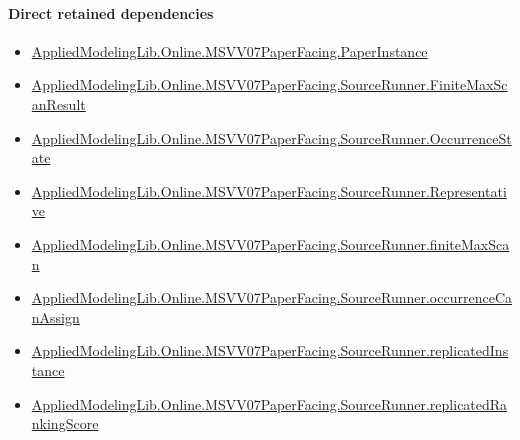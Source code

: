 \documentclass[10pt]{article}
\begin{document}
\paragraph{Direct retained dependencies}
\begin{itemize}\raggedright
\item \hyperlink{governing-declaration-11907576ec71eeb5}{Applied\allowbreak{}Modeling\allowbreak{}Lib.\allowbreak{}Online.\allowbreak{}MSVV07\allowbreak{}Paper\allowbreak{}Facing.\allowbreak{}Paper\allowbreak{}Instance}
\item \hyperlink{governing-declaration-ebb7db2383e5a26e}{Applied\allowbreak{}Modeling\allowbreak{}Lib.\allowbreak{}Online.\allowbreak{}MSVV07\allowbreak{}Paper\allowbreak{}Facing.\allowbreak{}Source\allowbreak{}Runner.\allowbreak{}Finite\allowbreak{}Max\allowbreak{}Scan\allowbreak{}Result}
\item \hyperlink{governing-declaration-2eff7815f49c1d41}{Applied\allowbreak{}Modeling\allowbreak{}Lib.\allowbreak{}Online.\allowbreak{}MSVV07\allowbreak{}Paper\allowbreak{}Facing.\allowbreak{}Source\allowbreak{}Runner.\allowbreak{}Occurrence\allowbreak{}State}
\item \hyperlink{governing-declaration-49a2a5677e1a3800}{Applied\allowbreak{}Modeling\allowbreak{}Lib.\allowbreak{}Online.\allowbreak{}MSVV07\allowbreak{}Paper\allowbreak{}Facing.\allowbreak{}Source\allowbreak{}Runner.\allowbreak{}Representative}
\item \hyperlink{governing-declaration-22b1949f835402cc}{Applied\allowbreak{}Modeling\allowbreak{}Lib.\allowbreak{}Online.\allowbreak{}MSVV07\allowbreak{}Paper\allowbreak{}Facing.\allowbreak{}Source\allowbreak{}Runner.\allowbreak{}finite\allowbreak{}Max\allowbreak{}Scan}
\item \hyperlink{governing-declaration-54a700f2397309bc}{Applied\allowbreak{}Modeling\allowbreak{}Lib.\allowbreak{}Online.\allowbreak{}MSVV07\allowbreak{}Paper\allowbreak{}Facing.\allowbreak{}Source\allowbreak{}Runner.\allowbreak{}occurrence\allowbreak{}Can\allowbreak{}Assign}
\item \hyperlink{paper-prerequisite-8364c561741f774b}{Applied\allowbreak{}Modeling\allowbreak{}Lib.\allowbreak{}Online.\allowbreak{}MSVV07\allowbreak{}Paper\allowbreak{}Facing.\allowbreak{}Source\allowbreak{}Runner.\allowbreak{}replicated\allowbreak{}Instance}
\item \hyperlink{governing-declaration-f916fd1125e7eee9}{Applied\allowbreak{}Modeling\allowbreak{}Lib.\allowbreak{}Online.\allowbreak{}MSVV07\allowbreak{}Paper\allowbreak{}Facing.\allowbreak{}Source\allowbreak{}Runner.\allowbreak{}replicated\allowbreak{}Ranking\allowbreak{}Score}
\end{itemize}
\hypertarget{governing-declaration-27a1c86efe6e20e7}{}
\end{document}
